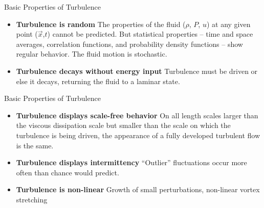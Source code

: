 \begin{frame}{Basic Properties of Turbulence}
\begin{itemize}
\item \textbf{Turbulence is random} \newline The properties of the fluid ($\rho$, $P$, $u$) at any given point ($\vec{x}$,$t$) cannot be predicted. But statistical properties – time and space averages, correlation functions, and probability density functions – show regular behavior. The fluid motion is stochastic.
\item \textbf{Turbulence decays without energy input} \newline Turbulence must be driven or else it decays, returning the fluid to a laminar state.
\end{itemize}
\end{frame}


\begin{frame}{Basic Properties of Turbulence}
\begin{itemize}
\item \textbf{Turbulence displays scale-free behavior} \newline On all length scales larger than the viscous dissipation scale but smaller than the scale on which the turbulence is being driven, the appearance of a fully developed turbulent flow is the same.
\item \textbf{Turbulence displays intermittency} \newline ``Outlier'' fluctuations occur more often than chance would predict.
\item \textbf{Turbulence is non-linear} \newline Growth of small perturbations, non-linear vortex stretching
\end{itemize}
\end{frame}


